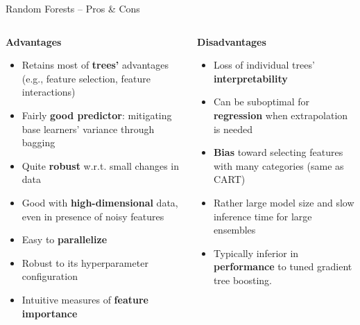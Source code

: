 \documentclass[11pt,compress,t,notes=noshow, xcolor=table]{beamer}
\newcommand{\highlight}[1]{\textcolor{hlcol}{\textbf{#1}}}
\newcommand{\positem}{\item[\textcolor{hlcol}{$\bm{+}$}]}
\newcommand{\negitem}{\item[\textcolor{hlcol}{$\bm{-}$}]}
\begin{document}
\begin{frame2}{Random Forests -- Pros \& Cons}

  \begin{columns}[onlytextwidth]
    \begin{column}{0.5\textwidth}
      \highlight{Advantages}
      \footnotesize
      \begin{itemize}
        \positem Retains most of \textbf{trees'} advantages (e.g., feature selection, feature interactions)
        \positem Fairly \textbf{good predictor}: mitigating base learners' variance through bagging
        \positem Quite \textbf{robust} w.r.t. small changes in data
        \positem Good with \textbf{high-dimensional} data, even in presence of noisy features
        \positem Easy to \textbf{parallelize}
        \positem Robust to its hyperparameter configuration
        \positem Intuitive measures of \textbf{feature importance}
      \end{itemize}
    \end{column}
    \begin{column}{0.5\textwidth}
      \highlight{Disadvantages}
      \footnotesize
      \begin{itemize}
        \negitem Loss of individual trees' \textbf{interpretability}
        \negitem Can be suboptimal for \textbf{regression} when extrapolation is needed
        \negitem \textbf{Bias} toward selecting features with many categories (same as CART)
        \negitem Rather large model size and slow inference time for large ensembles
        \negitem Typically inferior in \textbf{performance} to tuned gradient tree boosting.
      \end{itemize}
    \end{column}
  \end{columns}
  
\end{frame2}
\end{document}
